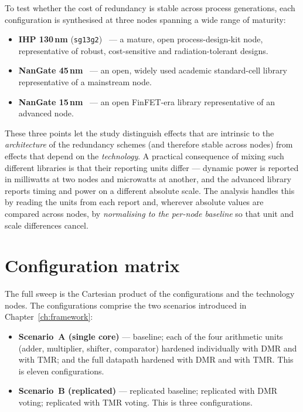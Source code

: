 To test whether the cost of redundancy is stable across process generations, each
configuration is synthesised at three nodes spanning a wide range of maturity:

\begin{itemize}
  \item \textbf{IHP 130\,nm} (\texttt{sg13g2})~\cite{ihp} --- a mature, open
        process-design-kit node, representative of robust, cost-sensitive and
        radiation-tolerant designs.
  \item \textbf{NanGate 45\,nm}~\cite{nangate} --- an open, widely used academic
        standard-cell library representative of a mainstream node.
  \item \textbf{NanGate 15\,nm}~\cite{nangate} --- an open FinFET-era library representative of
        an advanced node.
\end{itemize}

These three points let the study distinguish effects that are intrinsic to the
\emph{architecture} of the redundancy schemes (and therefore stable across nodes)
from effects that depend on the \emph{technology}. A practical consequence of
mixing such different libraries is that their reporting units differ --- dynamic
power is reported in milliwatts at two nodes and microwatts at another, and the
advanced library reports timing and power on a different absolute scale. The
analysis handles this by reading the units from each report and, wherever
absolute values are compared across nodes, by \emph{normalising to the per-node
baseline} so that unit and scale differences cancel.

\section{Configuration matrix}
\label{sec:ex-matrix}

The full sweep is the Cartesian product of the configurations and the technology
nodes. The configurations comprise the two scenarios introduced in
Chapter~\ref{ch:framework}:

\begin{itemize}
  \item \textbf{Scenario~A (single core)} --- baseline; each of the four
        arithmetic units (adder, multiplier, shifter, comparator) hardened
        individually with DMR and with TMR; and the full datapath hardened with
        DMR and with TMR. This is eleven configurations.
  \item \textbf{Scenario~B (replicated)} --- replicated baseline; replicated with
        DMR voting; replicated with TMR voting. This is three configurations.
\end{itemize}

